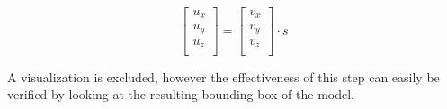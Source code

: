 \documentclass{bigdata}
\begin{document}
\[
\begin{bmatrix}
u_x \\
u_y \\
u_z \\
\end{bmatrix}
=
\begin{bmatrix}
v_x \\
v_y \\
v_z \\
\end{bmatrix}
\cdot s
\]

A visualization is excluded, however the effectiveness of this step can easily be verified by looking at the resulting bounding box of the model.

\newpage
\end{document}
